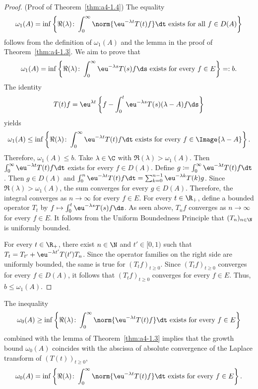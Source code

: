 \begin{proof}(Proof of Theorem~\ref{thm:a4-1.4}) 
The equality 
 \[ 
 \omega_1(A) = \inf \left\{ \Re(\lambda)\colon\int_0^\infty \norm{\eu^{-\lambda t} T(t) f }  \dt \text{ exists for all } f \in D(A) \right\} 
 \] 
 follows from the definition of\/ $\omega_1(A)$ and the lemma in the proof of Theorem~\ref{thm:a4-1.3}.
We aim to prove that
\[
\omega_1(A) = \inf \left\{ \Re(\lambda)\colon\int_0^\infty \eu^{-\lambda s} T(s) f  \ds \text{ exists for every } f \in E \right\}=: b. 
\]
The identity
\[
    T(t) f = \eu^{\lambda t} \left\{ f - \int_0^{t} \eu^{-\lambda s} T(s) (\lambda - A) f  \ds \right\}
\]
yields
\[
\omega_1(A) \leq \inf \left\{ \Re(\lambda)\colon\int_0^\infty \eu^{-\lambda t} T(t) f  \dt \text{ exists for every } f \in \Image{\lambda - A} \right\}.
\]
Therefore, $\omega_1(A) \leq b$.
Take $\lambda \in \C$ with $\Re(\lambda) > \omega_1(A)$. 
Then $\int_0^\infty \eu^{-\lambda t} T(t) f  \dt$ exists for every $f \in D(A)$. 
Define $g \coloneq  \int_0^\infty \eu^{-\lambda t} T(t) f  \dt$. 
Then $g \in D(A)$ and $\int_0^n \eu^{-\lambda t} T(t) f  \dt = \sum_{k=0}^{n-1} \eu^{-\lambda k} T(k) g$. 
Since $\Re(\lambda) > \omega_1(A)$, the sum converges for every $g \in D(A)$. 
Therefore, the integral converges as $n \to \infty$ for every $f \in E$.
For every $t \in \R_+$, define a bounded operator $T_t$ by $ f \mapsto \int_0^t \eu^{-\lambda s} T(s) f  \ds$. 
As seen above, $T_n f$ converges as $n \to \infty$ for every $f \in E$. 
It follows from the Uniform Boundedness Principle that $(T_n)_{n \in \N}$ is uniformly bounded.
%


For every $t \in \R_+$, there exist $n \in \N$ and $t' \in [0,1)$ such that $T_t = T_{t'} + \eu^{-\lambda t'} T(t') T_n$. 
Since the operator families on the right side are uniformly bounded, the same is true for $(T_t f)_{t \geq 0}$. 
Since $(T_t f)_{t \geq 0}$ converges for every $f \in D(A)$, it follows that $(T_t f)_{t \geq 0}$ converges for every $f \in E$. 
Thus, $b \leq \omega_1(A)$.
\end{proof}

%


The inequality
\[
    \omega_{0}(A) \geq \inf \left\{ \Re(\lambda)\colon\int_0^\infty \norm{\eu^{-\lambda t} T(t) f }  \dt 
    \text{ exists for every } f \in E \right\}
\]
combined with the lemma of Theorem~\ref{thm:a4-1.3} implies that the growth bound $\omega_{0}(A)$ coincides with the abscissa of absolute convergence of the Laplace transform of\/ $(T(t))_{t \geq 0}$, \ie
\begin{equation}\label{eq:a4-1.6}
   \omega_{0}(A) = \inf \left\{ \Re  (\lambda)\colon\int_0^\infty \norm{\eu^{-\lambda t} T(t) f }  \dt \text{ exists for every } f \in E \right\}.
\end{equation}
%


